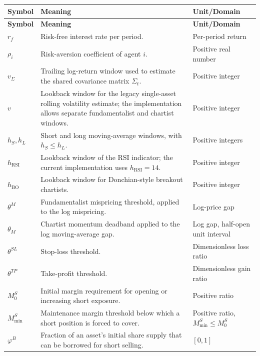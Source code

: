 \documentclass[12pt, a4paper]{article}
\begin{document}
    \begin{longtable}{@{}L{0.22\textwidth}L{0.50\textwidth}L{0.20\textwidth}@{}}
        \toprule
        \textbf{Symbol} & \textbf{Meaning} & \textbf{Unit/Domain} \\
        \midrule
        \endfirsthead
        \toprule
        \textbf{Symbol} & \textbf{Meaning} & \textbf{Unit/Domain} \\
        \midrule
        \endhead
        \(r_f\) & Risk-free interest rate per period. & Per-period return \\
        \(\rho_i\) & Risk-aversion coefficient of agent \(i\). & Positive real number \\
        \(v_{\Sigma}\) & Trailing log-return window used to estimate the shared covariance matrix \(\Sigma_t\). & Positive integer \\
        \(v\) & Lookback window for the legacy single-asset rolling volatility estimate; the implementation allows separate fundamentalist and chartist windows. & Positive integer \\
        \(h_S,h_L\) & Short and long moving-average windows, with \(h_S\le h_L\). & Positive integers \\
        \(h_{\mathrm{RSI}}\) & Lookback window of the RSI indicator; the current implementation uses \(h_{\mathrm{RSI}}=14\). & Positive integer \\
        \(h_{\mathrm{BO}}\) & Lookback window for Donchian-style breakout chartists. & Positive integer \\
        \(\theta^M\) & Fundamentalist mispricing threshold, applied to the log mispricing. & Log-price gap \\
        \(\theta_M\) & Chartist momentum deadband applied to the log moving-average gap. & Log gap, half-open unit interval \\
        \(\theta^{SL}\) & Stop-loss threshold. & Dimensionless loss ratio \\
        \(\theta^{TP}\) & Take-profit threshold. & Dimensionless gain ratio \\
        \(M_0^{S}\) & Initial margin requirement for opening or increasing short exposure. & Positive ratio \\
        \(M_{\min}^{S}\) & Maintenance margin threshold below which a short position is forced to cover. & Positive ratio, \(M_{\min}^{S}\le M_0^{S}\) \\
        \(\varphi^{B}\) & Fraction of an asset's initial share supply that can be borrowed for short selling. & \([0,1]\) \\

\end{longtable}
\end{document}
